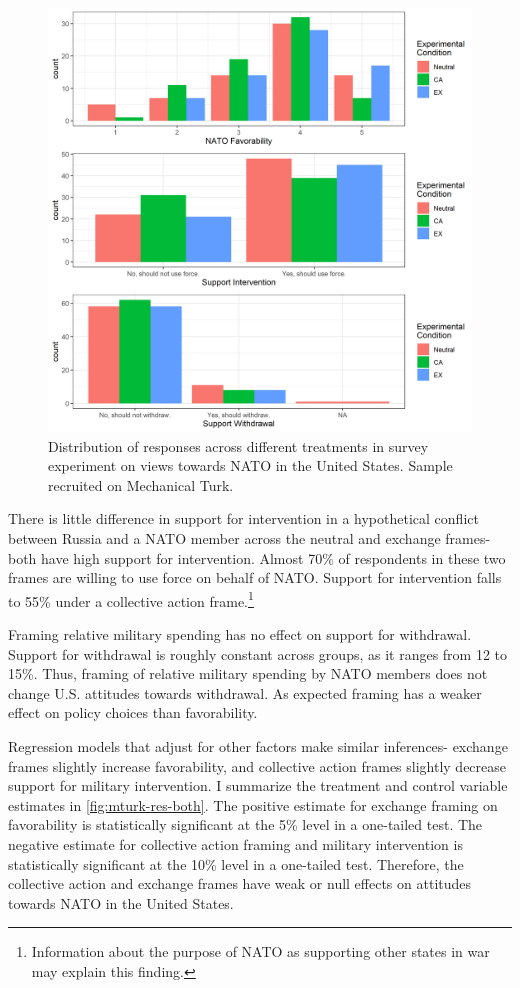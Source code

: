\documentclass[12pt]{article}
\begin{document}
\begin{figure}
\includegraphics[width = .95\textwidth]{../figures/raw-data.png} 
\caption{Distribution of responses across different treatments in survey experiment on views towards NATO in the United States. Sample recruited on Mechanical Turk.}
\label{fig:raw-us-data}
\end{figure}


There is little difference in support for intervention in a hypothetical conflict between Russia and a NATO member across the neutral and exchange frames- both have high support for intervention. 
Almost 70\% of respondents in these two frames are willing to use force on behalf of NATO. 
Support for intervention falls to 55\% under a collective action frame.\footnote{Information about the purpose of NATO as supporting other states in war may explain this finding.} 


Framing relative military spending has no effect on support for withdrawal. 
Support for withdrawal is roughly constant across groups, as it ranges from 12 to 15\%. 
Thus, framing of relative military spending by NATO members does not change U.S. attitudes towards withdrawal. 
As expected framing has a weaker effect on policy choices than favorability. 


Regression models that adjust for other factors make similar inferences- exchange frames slightly increase favorability, and collective action frames slightly decrease support for military intervention. 
I summarize the treatment and control variable estimates in \autoref{fig:mturk-res-both}.
The positive estimate for exchange framing on favorability is statistically significant at the 5\% level in a one-tailed test. 
The negative estimate for collective action framing and military intervention is statistically significant at the 10\% level in a one-tailed test.
Therefore, the collective action and exchange frames have weak or null effects on attitudes towards NATO in the United States. 
\end{document}
